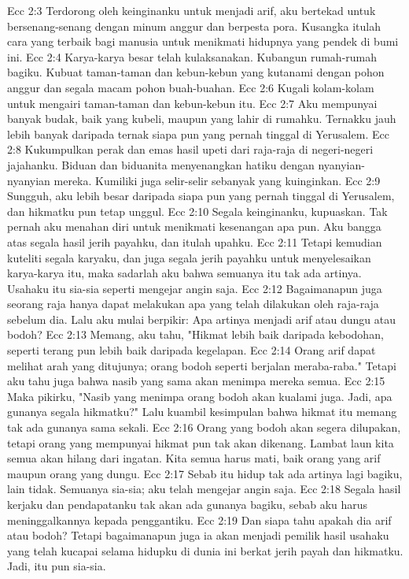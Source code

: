 Ecc 2:3  Terdorong oleh keinginanku untuk menjadi arif, aku bertekad untuk bersenang-senang dengan minum anggur dan berpesta pora. Kusangka itulah cara yang terbaik bagi manusia untuk menikmati hidupnya yang pendek di bumi ini.
Ecc 2:4  Karya-karya besar telah kulaksanakan. Kubangun rumah-rumah bagiku. Kubuat taman-taman dan kebun-kebun yang kutanami dengan pohon anggur dan segala macam pohon buah-buahan.
Ecc 2:6  Kugali kolam-kolam untuk mengairi taman-taman dan kebun-kebun itu.
Ecc 2:7  Aku mempunyai banyak budak, baik yang kubeli, maupun yang lahir di rumahku. Ternakku jauh lebih banyak daripada ternak siapa pun yang pernah tinggal di Yerusalem.
Ecc 2:8  Kukumpulkan perak dan emas hasil upeti dari raja-raja di negeri-negeri jajahanku. Biduan dan biduanita menyenangkan hatiku dengan nyanyian-nyanyian mereka. Kumiliki juga selir-selir sebanyak yang kuinginkan.
Ecc 2:9  Sungguh, aku lebih besar daripada siapa pun yang pernah tinggal di Yerusalem, dan hikmatku pun tetap unggul.
Ecc 2:10  Segala keinginanku, kupuaskan. Tak pernah aku menahan diri untuk menikmati kesenangan apa pun. Aku bangga atas segala hasil jerih payahku, dan itulah upahku.
Ecc 2:11  Tetapi kemudian kuteliti segala karyaku, dan juga segala jerih payahku untuk menyelesaikan karya-karya itu, maka sadarlah aku bahwa semuanya itu tak ada artinya. Usahaku itu sia-sia seperti mengejar angin saja.
Ecc 2:12  Bagaimanapun juga seorang raja hanya dapat melakukan apa yang telah dilakukan oleh raja-raja sebelum dia. Lalu aku mulai berpikir: Apa artinya menjadi arif atau dungu atau bodoh?
Ecc 2:13  Memang, aku tahu, "Hikmat lebih baik daripada kebodohan, seperti terang pun lebih baik daripada kegelapan.
Ecc 2:14  Orang arif dapat melihat arah yang ditujunya; orang bodoh seperti berjalan meraba-raba." Tetapi aku tahu juga bahwa nasib yang sama akan menimpa mereka semua.
Ecc 2:15  Maka pikirku, "Nasib yang menimpa orang bodoh akan kualami juga. Jadi, apa gunanya segala hikmatku?" Lalu kuambil kesimpulan bahwa hikmat itu memang tak ada gunanya sama sekali.
Ecc 2:16  Orang yang bodoh akan segera dilupakan, tetapi orang yang mempunyai hikmat pun tak akan dikenang. Lambat laun kita semua akan hilang dari ingatan. Kita semua harus mati, baik orang yang arif maupun orang yang dungu.
Ecc 2:17  Sebab itu hidup tak ada artinya lagi bagiku, lain tidak. Semuanya sia-sia; aku telah mengejar angin saja.
Ecc 2:18  Segala hasil kerjaku dan pendapatanku tak akan ada gunanya bagiku, sebab aku harus meninggalkannya kepada penggantiku.
Ecc 2:19  Dan siapa tahu apakah dia arif atau bodoh? Tetapi bagaimanapun juga ia akan menjadi pemilik hasil usahaku yang telah kucapai selama hidupku di dunia ini berkat jerih payah dan hikmatku. Jadi, itu pun sia-sia.
